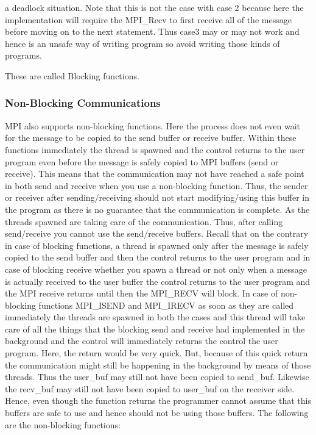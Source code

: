 \documentclass[12pt]{book}
\begin{document}
a deadlock situation. Note that this is not the case with case 2 because here the implementation will require the MPI\_Recv to first receive all of the message before moving on to the next statement. Thus case3 may or may not work and hence is an unsafe way of writing program so avoid writing those kinds of programs.

These are called Blocking functions.

\subsubsection{Non-Blocking Communications}
MPI also supports non-blocking functions. Here the process does not even wait for the message to be copied to the send buffer or receive buffer. Within these functions immediately the thread is spawned and the control returns to the user program even before the message is safely copied to MPI buffers (send or receive). This means that the communication may not have reached a safe point in both send and receive when you use a non-blocking function. Thus, the sender or receiver after sending/receiving should not start modifying/using this buffer in the program as there is no guarantee that the communication is complete. As the threads spawned are taking care of the communication. Thus, after calling send/receive you cannot use the send/receive buffers. Recall that on the contrary in case of blocking functions, a thread is spawned only after the message is safely copied to the send buffer and then the control returns to the user program and in case of blocking receive whether you spawn a thread or not only when a message is actually received to the user buffer the control returns to the user program and the MPI receive returns until then the MPI\_RECV will block. In case of non-blocking functions MPI\_ISEND and MPI\_IRECV as soon as they are called immediately the threads are spawned in both the cases and this thread will take care of all the things that the blocking send and receive had implemented in the background and the control will immediately returns the control the user program. Here, the return would be very quick. But, because of this quick return the communication might still be happening in the background by means of those threads. Thus the user\_buf may still not have been copied to send\_buf. Likewise the recv\_buf may still not have been copied to user\_buf on the receiver side. Hence, even though the function returns the programmer cannot assume that this buffers are safe to use and hence should not be using those buffers. The following are the non-blocking functions:
\end{document}
